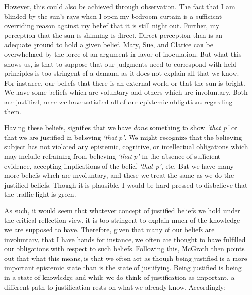 \documentclass[phdthesis,12pt,final]{wuthesis}
\theoremstyle{definition}
\theoremstyle{definition}
\theoremstyle{definition}
\theoremstyle{definition}
\theoremstyle{remark}
\begin{document}
However, this could also be achieved through observation. The fact that I am blinded by the sun's rays when I open my bedroom curtain is a sufficient overriding reason against my belief that it is still night out. Further, my perception that the sun is shinning is direct. Direct perception then is an adequate ground to hold a given belief. Mary, Sue, and Clarice can be overwhelmed by the force of an argument in favor of inoculation. But what this shows us, is that to suppose that our judgments need to correspond with held principles is too stringent of a demand as it does not explain all that we know. For instance, our beliefs that there is an external world or that the sun is bright. We have some beliefs which are voluntary and others which are involuntary. Both are justified, once we have satisfied all of our epistemic obligations regarding them.

\begin{Shaded}
\begin{Highlighting}[]

\end{Highlighting}
\end{Shaded}

Having these beliefs, signifies that we have \emph{done} something to show \emph{`that p'} or that we are justified in believing \emph{`that p'}. We might recognize that the believing subject has not violated any epistemic, cognitive, or intellectual obligations which may include refraining from believing \emph{`that p'} in the absence of sufficient evidence, accepting implications of the belief \emph{`that p'}, etc. But we have many more beliefs which are involuntary, and these we treat the same as we do the justified beliefs. Though it is plausible, I would be hard pressed to disbelieve that the traffic light is green.

As such, it would seem that whatever concept of justified beliefs we hold under the critical reflection view, it is too stringent to explain much of the knowledge we are supposed to have. Therefore, given that many of our beliefs are involuntary, that I have hands for instance, we often are thought to have fulfilled our obligations with respect to such beliefs. Following this, McGrath then points out that what this means, is that we often act as though being justified is a more important epistemic state than is the state of justifying. Being justified is being in a state of knowledge and while we do think of justification as important, a different path to justification rests on what we already know. Accordingly:
\end{document}
